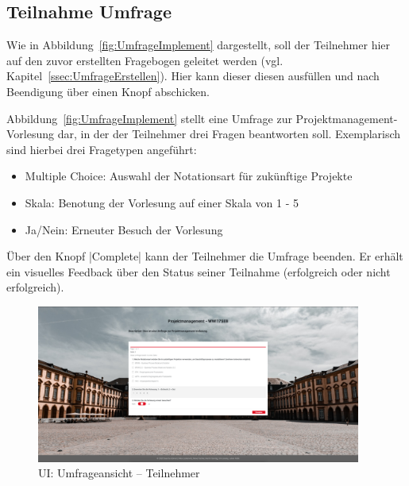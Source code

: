 
\subsection{Teilnahme Umfrage}
\label{ssec:UmfrageImplement}

Wie in Abbildung~\vref{fig:UmfrageImplement} dargestellt, soll der Teilnehmer hier auf den zuvor erstellten Fragebogen geleitet werden (vgl. Kapitel~\vref{ssec:UmfrageErstellen}).
Hier kann dieser diesen ausfüllen und nach Beendigung über einen Knopf abschicken.

Abbildung~\vref{fig:UmfrageImplement} stellt eine Umfrage zur Projektmanagement-Vorlesung dar, in der der Teilnehmer drei Fragen beantworten soll.
Exemplarisch sind hierbei drei Fragetypen angeführt:
\begin{itemize}
	\item Multiple Choice: Auswahl der Notationsart für zukünftige Projekte
	\item Skala: Benotung der Vorlesung auf einer Skala von 1 - 5
	\item Ja/Nein: Erneuter Besuch der Vorlesung
\end{itemize}

Über den Knopf \jinline|Complete| kann der Teilnehmer die Umfrage beenden.
Er erhält ein visuelles Feedback über den Status seiner Teilnahme (erfolgreich oder nicht erfolgreich).

\begin{figure}[h]
	\centering
	\includegraphics[width=0.95\textwidth, keepaspectratio]{img/client/TeilnahmeUmfrage.png}
	\captionsetup{justification=centering, format=plain}
	\caption[\acl{UI}: Umfrageansicht -- Teilnehmer]{\acl{UI}: Umfrageansicht -- Teilnehmer \\ \quelleScreenshot}
	\label{fig:UmfrageImplement}
\end{figure}
